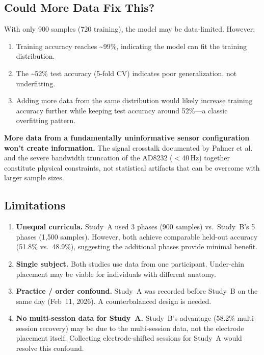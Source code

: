 \documentclass[11pt, a4paper]{article}
\begin{document}
\subsection{Could More Data Fix This?}

With only 900 samples (720 training), the model may be data-limited. However:
\begin{enumerate}
    \item Training accuracy reaches \textasciitilde99\%, indicating the model can fit the training distribution.
    \item The \textasciitilde52\% test accuracy (5-fold CV) indicates poor generalization, not underfitting.
    \item Adding more data from the same distribution would likely increase training accuracy further while keeping test accuracy around 52\%---a classic overfitting pattern.
\end{enumerate}

\textbf{More data from a fundamentally uninformative sensor configuration won't create information.} The signal crosstalk documented by Palmer et al.~\cite{palmer1999} and the severe bandwidth truncation of the AD8232 ($<$40\,Hz) together constitute physical constraints, not statistical artifacts that can be overcome with larger sample sizes.

\subsection{Limitations}
\label{sec:limitations}

\begin{enumerate}
    \item \textbf{Unequal curricula.} Study~A used 3 phases (900 samples) vs.\ Study~B's 5 phases (1{,}500 samples). However, both achieve comparable held-out accuracy (51.8\% vs.\ 48.9\%), suggesting the additional phases provide minimal benefit.

    \item \textbf{Single subject.} Both studies use data from one participant. Under-chin placement may be viable for individuals with different anatomy.

    \item \textbf{Practice / order confound.} Study~A was recorded before Study~B on the same day (Feb~11, 2026). A counterbalanced design is needed.

    \item \textbf{No multi-session data for Study~A.} Study~B's advantage (58.2\% multi-session recovery) may be due to the multi-session data, not the electrode placement itself. Collecting electrode-shifted sessions for Study~A would resolve this confound.
\end{enumerate}
\end{document}
